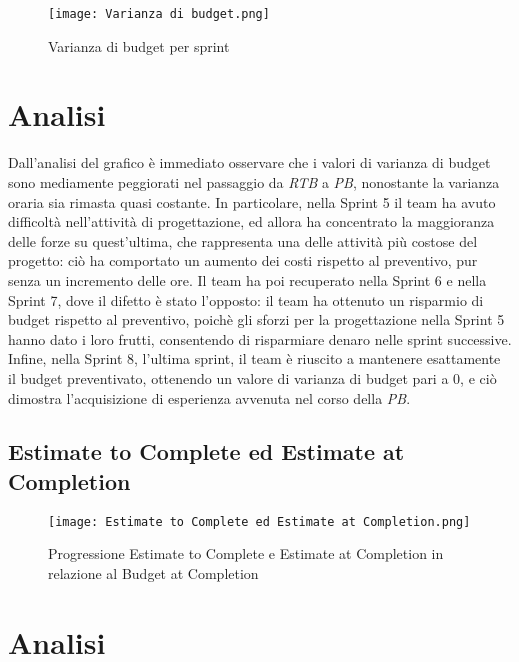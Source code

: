 \begin{figure}[h] 
    \centering
    \texttt{[image: Varianza di budget.png]}
    \caption{Varianza di budget per sprint} 
    \label{fig: Varianza di budget}
\end{figure}

\section*{Analisi}

Dall’analisi del grafico è immediato osservare che i valori di varianza di budget sono mediamente
peggiorati nel passaggio da \emph{RTB} a \emph{PB}, nonostante la varianza oraria sia rimasta quasi costante. In particolare, nella Sprint 5 il team ha avuto difficoltà nell'attività di progettazione, ed allora ha concentrato la maggioranza delle forze su quest'ultima, che rappresenta una delle attività più costose del progetto: ciò ha comportato un aumento dei costi rispetto al preventivo, pur senza un incremento delle ore. Il team ha poi recuperato nella Sprint 6 e nella Sprint 7, dove il difetto è stato l'opposto: il team ha ottenuto un risparmio di budget rispetto al preventivo, poichè gli sforzi per la progettazione nella Sprint 5 hanno dato i loro frutti, consentendo di risparmiare denaro nelle sprint successive. Infine, nella Sprint 8, l'ultima sprint, il team è riuscito a mantenere esattamente il budget preventivato, ottenendo un valore di varianza di budget pari a 0, e ciò dimostra l'acquisizione di esperienza avvenuta nel corso della \emph{PB}.

\newpage

\subsection{Estimate to Complete ed Estimate at Completion}
\label{subsec:Estimate to Complete ed Estimate at Completion}

\begin{figure}[h] 
    \centering
    \texttt{[image: Estimate to Complete ed Estimate at Completion.png]}
    \caption{Progressione Estimate to Complete e Estimate at Completion in relazione al Budget at Completion} 
    \label{fig: Estimate to Complete ed Estimate at Completion}
\end{figure}

\section*{Analisi}

